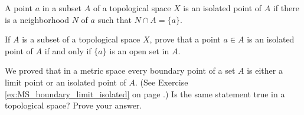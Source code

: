 \begin{definition} A point $a$ in a subset $A$ of a topological space $X$ is an isolated point of $A$ if there is a neighborhood $N$ of $a$ such that $N \cap A = \{a\}$. 
\end{definition}

	\ba

\item If $A$ is a subset of a topological space $X$, prove that a point $a \in A$ is an isolated point of $A$ if and only if $\{a\}$ is an open set in $A$. 

\item We proved that in a metric space every boundary point of a set $A$ is either a limit point or an isolated point of $A$. (See Exercise \ref{ex:MS_boundary_limit_isolated} on page \pageref{ex:MS_boundary_limit_isolated}.) Is the same statement true in a topological space? Prove your answer. 

	\ea

\begin{comment}

\ExerciseSolution 

\ba

\item Suppose $a$ is an isolated point of $A$. Then there is a neighborhood $N$ of $a$ in $X$ such that $N \cap A = \{a\}$. Since $N$ is a neighborhood of $a$, there is an open set $O$ in $N$ that contains $a$. Then 
\[O \cap A \subseteq N \cap A = \{a\}\]
and so $\{a\}$ is an open set in $A$.

Conversely, suppose that $\{a\}$ is an open set in $A$. Then there is an open set $O$ in $X$ such that $O \cap A = \{a\}$. But $O$ is a neighborhood of $a$ in $X$, so $a$ is an isolated point of $A$.  

\item This statement is true and the proof is the same as it was for metric spaces. Let $A$ be a subset of a topological space $X$, and let $x \in X$ be a boundary point of $A$. We consider two cases: $x \notin A$ and $x \in A$. 
\begin{itemize}
\item Suppose $x \notin A$. Let $N$ be a neighborhood of $x$. Since $x$ is a boundary point of $A$ we know that $N$ contains a point in $X \setminus A$ and a point (necessarily different from $x$) in $A$. So $x$ is a limit point of $A$. 

\item Now suppose that $x \in A$. Since $x$ is a boundary point of $A$ we know that $N$ contains a point in $X \setminus A$ and a point in $A$ (which may just be $x$). If every neighborhood of $x$ contains a point in $A$ different from $x$, then $x$ is a limit point of $A$. Otherwise, there is a neighborhood $N$ of $x$ that contains no point in $A$ different from $x$. That is, $N \cap A = \{x\}$. In this case, $x$ is an isolated point of $A$. 

\end{itemize}

\ea

\end{comment}


